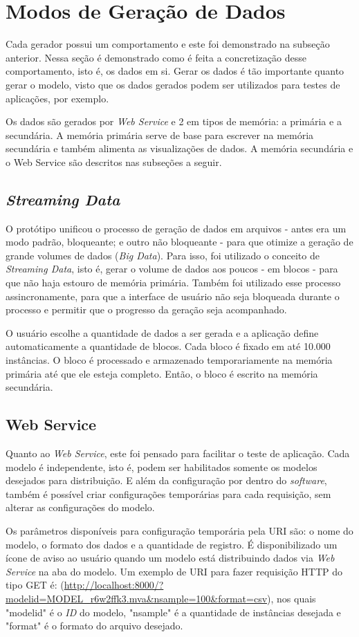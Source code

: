 \documentclass[
	12pt,				%
	openright,			%
	twoside,			%
	a4paper,			%
	english,			%
	brazil				%
	]{abntex2}
\begin{document}
	\section{Modos de Geração de Dados}
		Cada gerador possui um comportamento e este foi demonstrado na subseção anterior. 
		Nessa seção é demonstrado como é feita a concretização desse comportamento, isto é, os dados em si.
		Gerar os dados é tão importante quanto gerar o modelo, visto que os dados gerados podem ser utilizados para testes de aplicações, por exemplo.
		\par
		Os dados são gerados por \emph{Web Service} e 2 em tipos de memória: a primária e a secundária.
		A memória primária serve de base para escrever na memória secundária e também alimenta as visualizações de dados.
		A memória secundária e o Web Service são descritos nas subseções a seguir.

		\subsection{\emph{Streaming Data}}
			O protótipo unificou o processo de geração de dados em arquivos - antes era um modo padrão, bloqueante; e outro não bloqueante - para que otimize a geração de grande volumes de dados (\emph{Big Data}).
			Para isso, foi utilizado o conceito de \emph{Streaming Data}, isto é, gerar o volume de dados aos poucos - em blocos - para que não haja estouro de memória primária.
			Também foi utilizado esse processo assincronamente, para que a interface de usuário não seja bloqueada durante o processo e permitir que o progresso da geração seja acompanhado.
			\par
			O usuário escolhe a quantidade de dados a ser gerada e a aplicação define automaticamente a quantidade de blocos.
			Cada bloco é fixado em até 10.000 instâncias.
			O bloco é processado e armazenado temporariamente na memória primária até que ele esteja completo.
			Então, o bloco é escrito na memória secundária.
		\subsection{Web Service}
			Quanto ao \emph{Web Service}, este foi pensado para facilitar o teste de aplicação.
			Cada modelo é independente, isto é, podem ser habilitados somente os modelos desejados para distribuição.
			E além da configuração por dentro do \emph{software}, também é possível criar configurações temporárias para cada requisição, sem alterar as configurações do modelo.
			\par
			Os parâmetros disponíveis para configuração temporária pela URI são: o nome do modelo, o formato dos dados e a quantidade de registro.
			É disponibilizado um ícone de aviso ao usuário quando um modelo está distribuindo dados via \emph{Web Service} na aba do modelo.
			Um exemplo de URI para fazer requisição HTTP do tipo GET é: (\url{http://localhost:8000/?modelid=MODEL_r6w2ffk3.mva&nsample=100&format=csv}), nos quais "modelid" é o \emph{ID} do modelo, "nsample" é a quantidade de instâncias desejada e "format" é o formato do arquivo desejado.
	 
\end{document}
